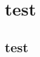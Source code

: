 \documentclass[12pt,t,aspectratio=43]{beamer}
\begin{document}
\section{test}
\subsection{test}
\begin{frame}
\end{frame}
\end{document}
